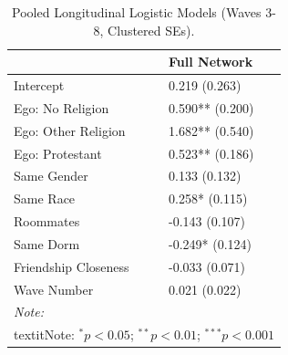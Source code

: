 \begin{table}

\caption{\label{tab:pooled-reg}Pooled Longitudinal Logistic Models (Waves 3-8, Clustered SEs).}
\centering
\begin{tabular}[t]{ll}
\toprule
  & Full Network\\
\midrule
Intercept & 0.219 (0.263)\\
Ego: No Religion & 0.590** (0.200)\\
Ego: Other Religion & 1.682** (0.540)\\
Ego: Protestant & 0.523** (0.186)\\
Same Gender & 0.133 (0.132)\\
\addlinespace
Same Race & 0.258* (0.115)\\
Roommates & -0.143 (0.107)\\
Same Dorm & -0.249* (0.124)\\
Friendship Closeness & -0.033 (0.071)\\
Wave Number & 0.021 (0.022)\\
\bottomrule
\multicolumn{2}{l}{\rule{0pt}{1em}\textit{Note: }}\\
\multicolumn{2}{l}{\rule{0pt}{1em}textit{Note:} $^{*} p < 0.05$; $^{**} p < 0.01$; $^{***} p < 0.001$}\\
\end{tabular}
\end{table}
